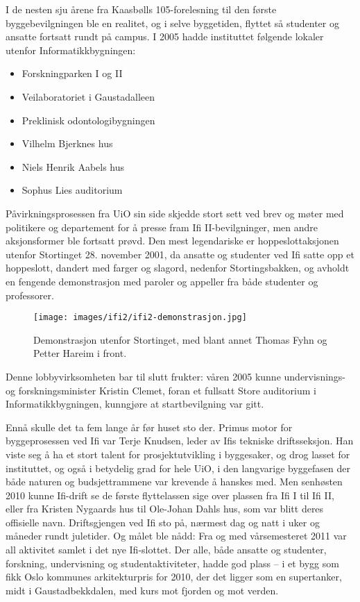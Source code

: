 I de nesten sju årene fra Kaasbølls 105-forelesning til den første byggebevilgningen ble en realitet, og i selve byggetiden, flyttet så studenter og ansatte fortsatt rundt på campus. I 2005 hadde instituttet følgende lokaler utenfor Informatikkbygningen:

\begin{itemize}
	\item Forskningparken I og II
	\item Veilaboratoriet i Gaustadalleen
	\item Preklinisk odontologibygningen
	\item Vilhelm Bjerknes hus
	\item Niels Henrik Aabels hus
	\item Sophus Lies auditorium
\end{itemize}

Påvirkningsprosessen fra UiO sin side skjedde stort sett ved brev og møter med politikere og departement for å presse fram Ifi II-bevilgninger, men andre aksjonsformer ble fortsatt prøvd. Den mest legendariske er hoppeslottaksjonen utenfor Stortinget 28. november 2001, da ansatte og studenter ved Ifi satte opp et hoppeslott, dandert med farger og slagord, nedenfor Stortingsbakken, og avholdt en fengende demonstrasjon med paroler og appeller fra både studenter og professorer.

\begin{figure}[h!]
	\centering
	\texttt{[image: images/ifi2/ifi2-demonstrasjon.jpg]}
	\caption{Demonstrasjon utenfor Stortinget, med blant annet Thomas Fyhn og Petter Hareim i front.}
\end{figure}

Denne lobbyvirksomheten bar til slutt frukter: våren 2005 kunne undervisnings- og forskningsminister Kristin Clemet, foran et fullsatt Store auditorium i Informatikkbygningen, kunngjøre at startbevilgning var gitt.

Ennå skulle det ta fem lange år før huset sto der. Primus motor for byggeprosessen ved Ifi var Terje Knudsen, leder av Ifis tekniske driftsseksjon. Han viste seg å ha et stort talent for prosjektutvikling i byggesaker, og drog lasset for instituttet, og også i betydelig grad for hele UiO, i den langvarige
byggefasen der både naturen og budsjettrammene var krevende å hanskes med. Men senhøsten 2010 kunne Ifi-drift se de første flyttelassen sige over plassen fra Ifi I til Ifi II, eller fra Kristen Nygaards hus til Ole-Johan Dahls hus, som var blitt deres offisielle navn. Driftsgjengen ved Ifi sto på,
nærmest dag og natt i uker og måneder rundt juletider. Og målet ble nådd: Fra og med vårsemesteret 2011 var all aktivitet samlet i det nye Ifi-slottet. Der alle, både ansatte og studenter, forskning, undervisning og studentaktiviteter, hadde god plass – i et bygg som fikk Oslo kommunes arkitekturpris for 2010, der det ligger som en supertanker, midt i Gaustadbekkdalen, med kurs mot fjorden og mot verden.


